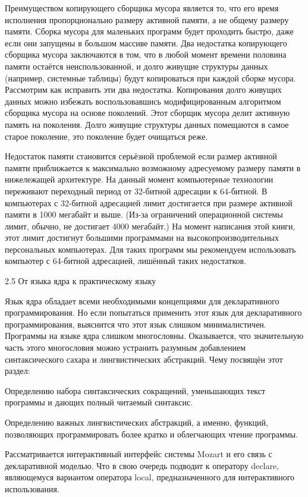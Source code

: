Преимуществом копирующего сборщика мусора является то, что его время исполнения пропорционально размеру активной памяти, а не общему размеру памяти. Сборка мусора для маленьких программ будет проходить быстро, даже если они запущены в большом массиве памяти. Два недостатка копирующего сборщика мусора заключаются в том, что в любой момент времени половина памяти остаётся неиспользованной, и долго живущие структуры данных (например, системные таблицы) будут копироваться при каждой сборке мусора. Рассмотрим как исправить эти два недостатка. Копирования долго живущих данных можно избежать воспользовавшись модифицированным алгоритмом сборщика мусора на основе поколений. Этот сборщик мусора делит активную память на поколения. Долго живущие структуры данных помещаются в самое старое поколение, это поколение будет очищаться реже.

Недостаток памяти становится серьёзной проблемой если размер активной памяти приближается к максимально возможному адресуемому размеру памяти в нижележащей архитектуре. На данный момент компьютерные технологии переживают переходный период от 32-битной адресации к 64-битной. В компьютерах с 32-битной адресацией лимит достигается при размере активной памяти в 1000 мегабайт и выше. (Из-за ограничений операционной системы лимит, обычно, не достигает 4000 мегабайт.) На момент написания этой книги, этот лимит достигнут большими программами на высокопроизводительных персональных компьютерах. Для таких программ мы рекомендуем использовать компьютер с 64-битной адресацией, лишённый таких недостатков.

2.5 От языка ядра к практическому языку

Язык ядра обладает всеми необходимыми концепциями для декларативного программирования. Но если попытаться применить этот язык для декларативного программирования, выяснится что этот язык слишком минималистичен. Программы на языке ядра слишком многословны. Оказывается, что значительную часть этого многословия можно устранить разумным добавлением синтаксического сахара и лингвистических абстракций. Чему посвящён этот раздел:

Определению набора синтаксических сокращений, уменьшающих текст программы и дающих полный читаемый синтаксис.

Определению важных лингвистических абстракций, а именно, функций, позволяющих программировать более кратко и облегчающих чтение программы.

Рассматривается интерактивный интерфейс системы Mozart и его связь с декларативной моделью. Что в свою очередь подводит к оператору declare, являющемуся вариантом оператора local, предназначенного для интерактивного использования.

